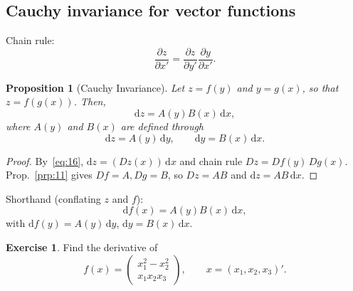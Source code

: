 \documentclass[14pt]{extarticle}
\theoremstyle{plain}
\newtheorem{proposition}{Proposition}
\theoremstyle{definition}
\newtheorem{exercise}{Exercise}
\theoremstyle{remark}
\newcommand{\dd}{\mathrm{d}}
\begin{document}
\subsection{Cauchy invariance for vector functions}\label{sec:4.5}

Chain rule:
\begin{equation}\label{eq:18}
\frac{\partial z}{\partial x'} = \frac{\partial z}{\partial y'} \frac{\partial y}{\partial x'}.
\end{equation}

\begin{proposition}[Cauchy Invariance]\label{prp:12}
Let $z = f(y)$ and $y = g(x)$, so that $z = f(g(x))$. Then,
\[
\dd z = A(y) B(x)\, \dd x,
\]
where $A(y)$ and $B(x)$ are defined through
\[
\dd z = A(y)\, \dd y, \qquad \dd y = B(x)\, \dd x.
\]
\end{proposition}

\begin{proof}
By~\eqref{eq:16}, $\dd z = (Dz(x))\,\dd x$ and chain rule $Dz = Df(y)\,Dg(x)$. Prop.~\ref{prp:11} gives $Df = A, Dg = B$, so $Dz = AB$ and $\dd z = AB\,\dd x$.
\end{proof}

Shorthand (conflating $z$ and $f$):
\begin{equation}\label{eq:19}
\dd f(x) = A(y) B(x)\, \dd x,
\end{equation}
with $\dd f(y) = A(y)\,\dd y$, $\dd y = B(x)\,\dd x$.

\begin{exercise}\label{exer:12}
Find the derivative of
\[
f(x) = \begin{pmatrix} x_1^2 - x_2^2 \\ x_1 x_2 x_3 \end{pmatrix}, \qquad
x = (x_1, x_2, x_3)'.
\]
\end{exercise}
\end{document}
